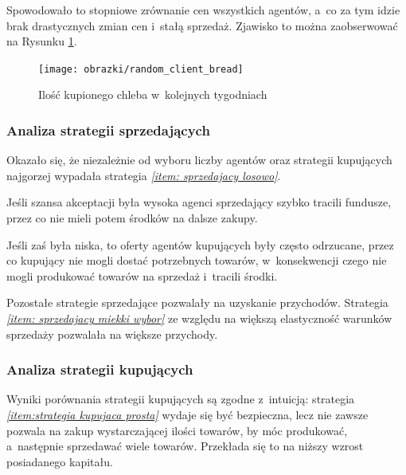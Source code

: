 \documentclass[12pt]{article}
\begin{document}
Spowodowało to stopniowe zrównanie cen wszystkich agentów, a~co za tym idzie brak drastycznych zmian cen i~stałą sprzedaż. Zjawisko to można zaobserwować
na Rysunku \ref{fig:constant client}.

\begin{figure} [H]
 \centering
    \texttt{[image: obrazki/random\_client\_bread]}
 \caption{Ilość kupionego chleba w~kolejnych tygodniach}
 \label{fig:constant client}
\end{figure}

\subsubsection{Analiza strategii sprzedających}
Okazało się, że niezależnie od wyboru liczby agentów oraz strategii kupujących najgorzej wypadała strategia \emph{\ref{item: sprzedajacy losowo}}. 

Jeśli szansa akceptacji była wysoka agenci sprzedający szybko tracili fundusze, przez co nie mieli potem
środków na dalsze zakupy. 

Jeśli zaś była niska, to oferty agentów kupujących były często odrzucane, przez co kupujący nie mogli dostać potrzebnych towarów, w~konsekwencji czego nie mogli produkować towarów na sprzedaż i~tracili środki.

Pozostałe strategie sprzedające pozwalały na uzyskanie przychodów. Strategia \emph{\ref{item: sprzedajacy miekki wybor}} ze względu na większą elastyczność warunków sprzedaży pozwalała na większe przychody.


\subsubsection{Analiza strategii kupujących}
Wyniki porównania strategii kupujących są zgodne z~intuicją: strategia \emph{\ref{item:strategia kupujaca prosta}} wydaje się być bezpieczna, lecz nie zawsze pozwala na zakup wystarczającej ilości towarów, by móc produkować,
a~następnie sprzedawać wiele towarów. Przekłada się to na niższy wzrost posiadanego kapitału.
\end{document}

